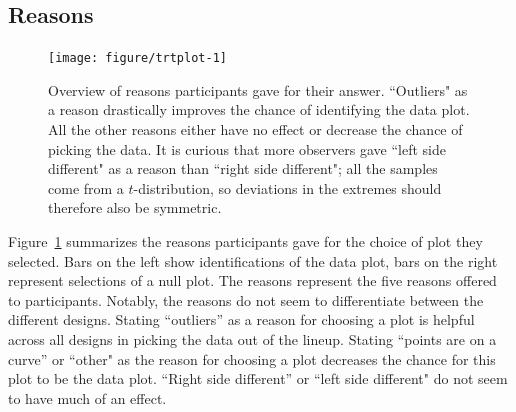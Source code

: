 \documentclass[12pt]{article}\usepackage[]{graphicx}\usepackage[]{color}
\newenvironment{knitrout}{}{} %
\begin{document}
\begin{appendix}
\section{Reasons}

\begin{figure}[hbt]
\centering
\begin{knitrout}
\color{fgcolor}
\texttt{[image: figure/trtplot-1]} 

\end{knitrout}
\caption{\label{fig:choices}Overview of reasons participants gave for  their answer. ``Outliers" as a reason drastically improves the chance of identifying the data plot. All the other reasons either have no effect or decrease the chance of picking the data. It is curious that more observers gave ``left side different" as a reason than ``right side different";   all the samples  come from a  $t$-distribution, so deviations in the extremes should therefore also be symmetric.}
\end{figure}
\afterpage{\clearpage}

Figure~\ref{fig:choices} summarizes the reasons participants gave for the choice of plot they selected. Bars on the left show  identifications of the data plot, bars on the right represent selections of a null plot. The reasons represent the five reasons offered  to participants. Notably, the reasons do not seem to differentiate between the different designs. Stating ``outliers'' as a reason for choosing a plot is helpful across all designs in picking the data out of the lineup. Stating ``points are on a curve'' or ``other"  as the reason for choosing a plot decreases the chance for this plot to be the data plot. ``Right side different'' or ``left side different" do not seem to have much of an effect.


\end{appendix}
\end{document}
